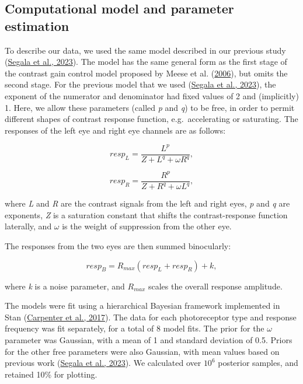 \documentclass[
]{article}
\begin{document}
\hypertarget{computational-model-and-parameter-estimation}{%
\subsection{Computational model and parameter estimation}\label{computational-model-and-parameter-estimation}}

To describe our data, we used the same model described in our previous study (\protect\hyperlink{ref-Segala2023}{Segala et al., 2023}). The model has the same general form as the first stage of the contrast gain control model proposed by Meese et al. (\protect\hyperlink{ref-Meese2006}{2006}), but omits the second stage. For the previous model that we used (\protect\hyperlink{ref-Segala2023}{Segala et al., 2023}), the exponent of the numerator and denominator had fixed values of 2 and (implicitly) 1. Here, we allow these parameters (called \emph{p} and \emph{q}) to be free, in order to permit different shapes of contrast response function, e.g.~accelerating or saturating. The responses of the left eye and right eye channels are as follows:

\begin{equation}
\label{eq:respL}
resp_L = \frac{L^p}{Z + L^q + \omega R^q},
\end{equation}

\begin{equation}
\label{eq:respR}
resp_R = \frac{R^p}{Z + R^q + \omega L^q},
\end{equation}

\noindent where \emph{L} and \emph{R} are the contrast signals from the left and right eyes, \emph{p} and \emph{q} are exponents, \emph{Z} is a saturation constant that shifts the contrast-response function laterally, and \(\omega\) is the weight of suppression from the other eye.

The responses from the two eyes are then summed binocularly:

\begin{equation}
\label{eq:respB}
resp_B = R_{max}(resp_L + resp_R) + k,
\end{equation}

\noindent where \emph{k} is a noise parameter, and \(R_{max}\) scales the overall response amplitude.

The models were fit using a hierarchical Bayesian framework implemented in Stan (\protect\hyperlink{ref-Carpenter2017}{Carpenter et al., 2017}). The data for each photoreceptor type and response frequency was fit separately, for a total of 8 model fits. The prior for the \(\omega\) parameter was Gaussian, with a mean of 1 and standard deviation of 0.5. Priors for the other free parameters were also Gaussian, with mean values based on previous work (\protect\hyperlink{ref-Segala2023}{Segala et al., 2023}). We calculated over \ensuremath{10^{6}} posterior samples, and retained 10\% for plotting.
\end{document}
